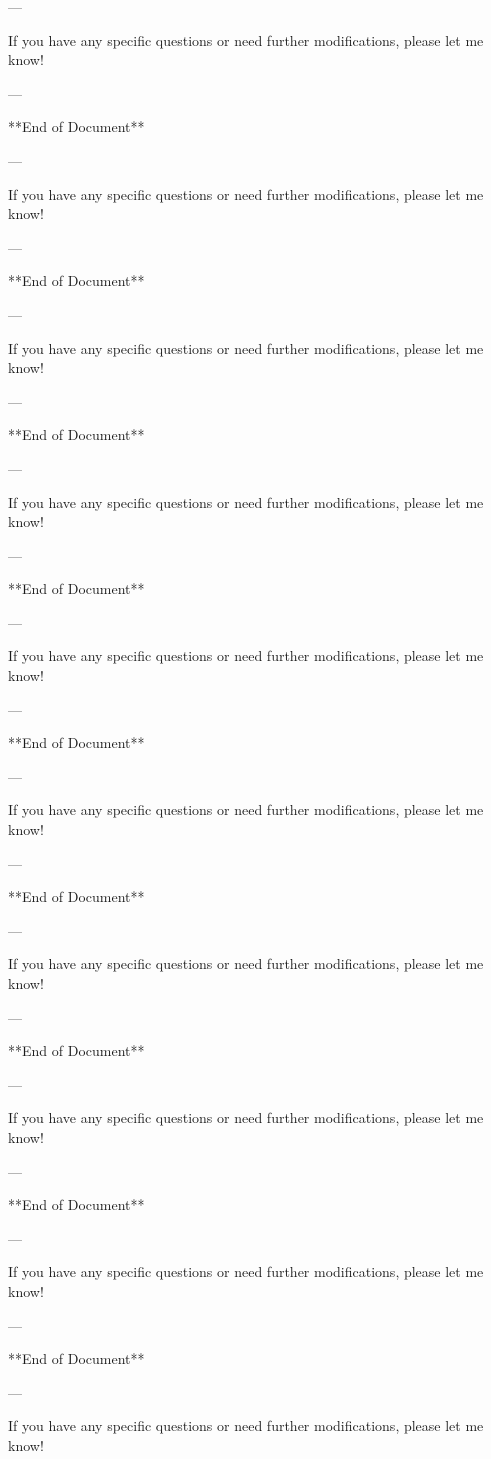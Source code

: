 --- 

If you have any specific questions or need further modifications, please let me know! 

--- 

**End of Document** 

--- 

If you have any specific questions or need further modifications, please let me know! 

--- 

**End of Document** 

--- 

If you have any specific questions or need further modifications, please let me know! 

--- 

**End of Document** 

--- 

If you have any specific questions or need further modifications, please let me know! 

--- 

**End of Document** 

--- 

If you have any specific questions or need further modifications, please let me know! 

--- 

**End of Document** 

--- 

If you have any specific questions or need further modifications, please let me know! 

--- 

**End of Document** 

--- 

If you have any specific questions or need further modifications, please let me know! 

--- 

**End of Document** 

--- 

If you have any specific questions or need further modifications, please let me know! 

--- 

**End of Document** 

--- 

If you have any specific questions or need further modifications, please let me know! 

--- 

**End of Document** 

--- 

If you have any specific questions or need further modifications, please let me know! 

